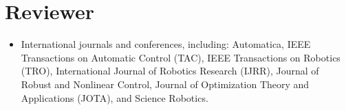 \documentclass[11pt,a4paper,sans]{moderncv}
\begin{document}
\section{Reviewer}

\vspace{5pt}

\begin{itemize}
	


\item
International journals and conferences, including:
Automatica,
IEEE Transactions on Automatic Control (TAC),
IEEE Transactions on Robotics (TRO),
International Journal of Robotics Research (IJRR),
Journal of Robust and Nonlinear Control,
Journal of Optimization Theory and Applications (JOTA), and
Science Robotics.

\end{itemize}


%
%
%
%
%
%

\end{document}

